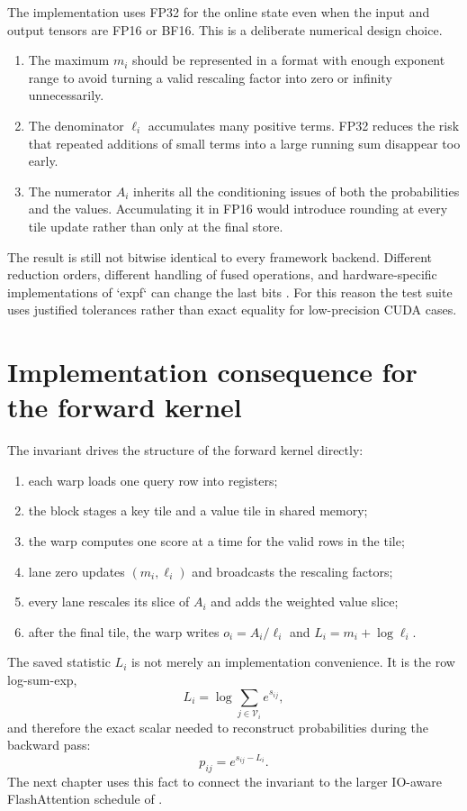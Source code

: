 The implementation uses FP32 for the online state even when the input and output tensors are FP16 or BF16. This is a deliberate numerical design choice.

\begin{enumerate}
  \item The maximum $m_i$ should be represented in a format with enough exponent range to avoid turning a valid rescaling factor into zero or infinity unnecessarily.
  \item The denominator $\ell_i$ accumulates many positive terms. FP32 reduces the risk that repeated additions of small terms into a large running sum disappear too early.
  \item The numerator $A_i$ inherits all the conditioning issues of both the probabilities and the values. Accumulating it in FP16 would introduce rounding at every tile update rather than only at the final store.
\end{enumerate}

The result is still not bitwise identical to every framework backend. Different reduction orders, different handling of fused operations, and hardware-specific implementations of `expf` can change the last bits \citep{ieee7542019,pytorch212numerics}. For this reason the test suite uses justified tolerances rather than exact equality for low-precision CUDA cases.

\section{Implementation consequence for the forward kernel}

The invariant drives the structure of the forward kernel directly:
\begin{enumerate}
  \item each warp loads one query row into registers;
  \item the block stages a key tile and a value tile in shared memory;
  \item the warp computes one score at a time for the valid rows in the tile;
  \item lane zero updates $(m_i,\ell_i)$ and broadcasts the rescaling factors;
  \item every lane rescales its slice of $A_i$ and adds the weighted value slice;
  \item after the final tile, the warp writes $o_i = A_i/\ell_i$ and $L_i = m_i + \log \ell_i$.
\end{enumerate}

The saved statistic $L_i$ is not merely an implementation convenience. It is the row log-sum-exp,
\begin{equation}
  L_i = \log \sum_{j\in\mathcal V_i} e^{s_{ij}},
\end{equation}
and therefore the exact scalar needed to reconstruct probabilities during the backward pass:
\begin{equation}
  p_{ij} = e^{s_{ij} - L_i}.
\end{equation}
The next chapter uses this fact to connect the invariant to the larger IO-aware FlashAttention schedule of \citet{dao2022flashattention}.
